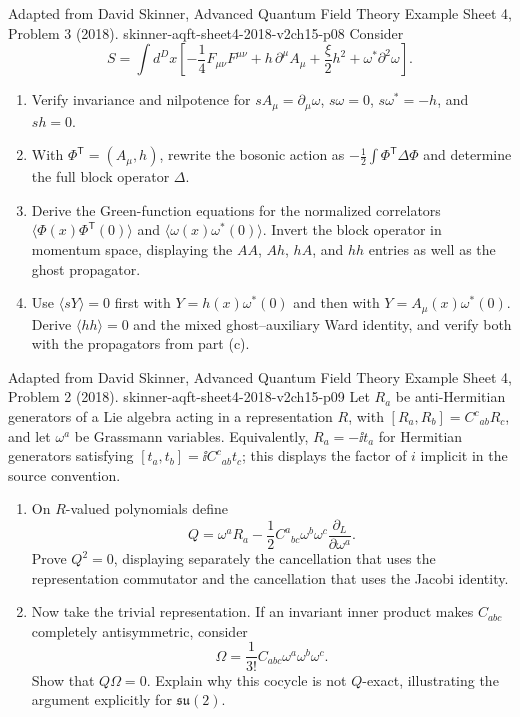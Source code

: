 \begin{enumerate}
  {Adapted from David Skinner, Advanced Quantum Field Theory Example Sheet 4, Problem 3 (2018).}
  {skinner-aqft-sheet4-2018-v2ch15-p08}
  Consider
  \[
    S=\int d^Dx\left[-\frac14F_{\mu\nu}F^{\mu\nu}
      +h\,\partial^\mu A_\mu+\frac{\xi}{2}h^2
      +\omega^*\partial^2\omega\right].
  \]
  \begin{enumerate}
    \item[(a)] Verify invariance and nilpotence for
      \(sA_\mu=\partial_\mu\omega\), \(s\omega=0\),
      \(s\omega^*=-h\), and \(sh=0\).
    \item[(b)] With \(\Phi^{\mathsf T}=(A_\mu,h)\), rewrite the bosonic action as
      \(-\frac12\int\Phi^{\mathsf T}\Delta\Phi\) and determine the full block
      operator \(\Delta\).
    \item[(c)] Derive the Green-function equations for the normalized
      correlators
      \(\langle\Phi(x)\Phi^{\mathsf T}(0)\rangle\) and
      \(\langle\omega(x)\omega^*(0)\rangle\).  Invert the block operator in
      momentum space, displaying the \(AA\), \(Ah\), \(hA\), and \(hh\)
      entries as well as the ghost propagator.
    \item[(d)] Use \(\langle sY\rangle=0\) first with
      \(Y=h(x)\omega^*(0)\) and then with
      \(Y=A_\mu(x)\omega^*(0)\).  Derive
      \(\langle hh\rangle=0\) and the mixed ghost--auxiliary Ward identity,
      and verify both with the propagators from part (c).
  \end{enumerate}

  {Adapted from David Skinner, Advanced Quantum Field Theory Example Sheet 4, Problem 2 (2018).}
  {skinner-aqft-sheet4-2018-v2ch15-p09}
  Let \(R_a\) be anti-Hermitian generators of a Lie algebra acting in a
  representation \(R\), with
  \([R_a,R_b]=C^c{}_{ab}R_c\), and let \(\omega^a\) be Grassmann variables.
  Equivalently, \(R_a=-\ii t_a\) for Hermitian generators satisfying
  \([t_a,t_b]=\ii C^c{}_{ab}t_c\); this displays the factor of \(i\) implicit
  in the source convention.
  \begin{enumerate}
    \item[(a)]
    On \(R\)-valued polynomials define
    \[
      Q=\omega^aR_a-\frac12C^a{}_{bc}\omega^b\omega^c
        \frac{\partial_L}{\partial\omega^a}.
    \]
    Prove \(Q^2=0\), displaying separately the cancellation that uses the
    representation commutator and the cancellation that uses the Jacobi
    identity.
    \item[(b)]
    Now take the trivial representation.  If an invariant inner product makes
    \(C_{abc}\) completely antisymmetric, consider
    \[
      \Omega=\frac1{3!}C_{abc}\omega^a\omega^b\omega^c.
    \]
    Show that \(Q\Omega=0\).  Explain why this cocycle is not \(Q\)-exact,
    illustrating the argument explicitly for \(\mathfrak{su}(2)\).
  \end{enumerate}


\end{enumerate}
